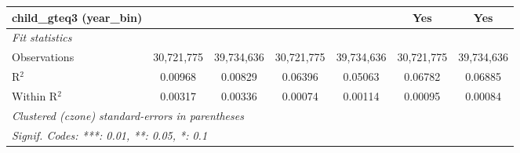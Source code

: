 \begin{tabular}{lcccccc}
child\_gteq3 (year\_bin) &  &  &  &  & Yes & Yes\\
\midrule \emph{Fit statistics}&  & & & & & \\
Observations & 30,721,775&39,734,636&30,721,775&39,734,636&30,721,775&39,734,636\\
R$^2$ & 0.00968&0.00829&0.06396&0.05063&0.06782&0.06885\\
Within R$^2$ & 0.00317&0.00336&0.00074&0.00114&0.00095&0.00084\\
\midrule\midrule\multicolumn{7}{l}{\emph{Clustered (czone) standard-errors in parentheses}}\\
\multicolumn{7}{l}{\emph{Signif. Codes: ***: 0.01, **: 0.05, *: 0.1}}\\
\end{tabular}


